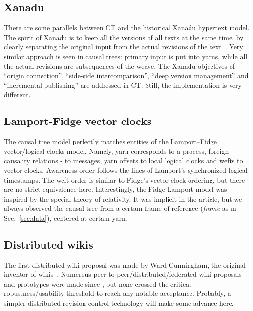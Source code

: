 \documentclass{sig-alternate}
\begin{document}
\subsection{Xanadu}

There are some parallels between CT and the historical Xanadu hypertext model.
The spirit of Xanadu is to keep all the versions of all texts at the same time, by clearly separating the original input from the actual revisions of the text~\cite{xanacarpet}.
Very similar  approach is seen in causal trees: primary input is put into yarns, while all the actual revisions are subsequences of the weave.
The Xanadu objectives of ``origin connection'', ``side-side intercomparison'', ``deep version management'' and ``incremental publishing'' are addressed in CT.
Still, the implementation is very different.

\subsection{Lamport-Fidge vector clocks} \label{sec:lamport}

The causal tree model perfectly matches entities of the Lamport--Fidge~\cite{lamport,fidge} vector/logical clocks model.
Namely, yarn corresponds to a process, foreign causality relations - to messages, yarn offsets to local logical clocks and wefts to vector clocks. 
Awareness order follows the lines of Lamport's synchronized logical timestamps.
The weft order is similar to Fidge's vector clock ordering, but there are no strict equivalence here.
Interestingly, the Fidge-Lamport model was inspired by the special theory of relativity.
It was implicit in the article, but we always observed the causal tree from a certain frame of reference (\emph{frame} as in Sec.~\ref{sec:data}), centered at certain yarn.

\subsection{Distributed wikis}

The first distributed wiki proposal was made by Ward Cunningham, the original inventor of wikis~\cite{folk-memory}.
Numerous peer-to-peer/distributed/federated wiki proposals and prototypes were made since \cite{www06,buraga,distriwiki,concerto}, but none crossed the critical robustness/usability threshold to reach any notable acceptance. Probably, a simpler distributed revision control technology will make some advance here.
\end{document}
